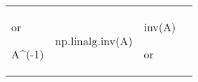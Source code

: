 \documentclass[10pt, landscape]{article}
\newenvironment{Shaded}{}{}
\newcommand{\FloatTok}[1]{\textcolor[rgb]{0.25,0.63,0.44}{{#1}}}
\newcommand{\NormalTok}[1]{{#1}}
\begin{document}
\begin{multicols*}{2}
\begin{tabular}[ ]{@{}llll@{}}
\begin{minipage}[t]{0.22\columnwidth}
or

\begin{Shaded}
\begin{Highlighting}[]
\NormalTok{A^(-}\FloatTok{1}\NormalTok{)}
\end{Highlighting}
\end{Shaded}
\strut
\end{minipage} & \begin{minipage}[t]{0.23\columnwidth}\raggedright\strut
\begin{Shaded}
\begin{Highlighting}[]
\NormalTok{np.linalg.inv(A)}
\end{Highlighting}
\end{Shaded}
\strut
\end{minipage} & \begin{minipage}[t]{0.20\columnwidth}\raggedright\strut
\begin{Shaded}
\begin{Highlighting}[]
\NormalTok{inv(A)}
\end{Highlighting}
\end{Shaded}

or


\end{minipage}
\end{tabular}
\end{multicols*}
\end{document}
